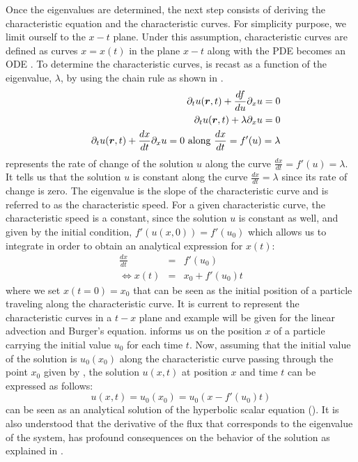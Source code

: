 Once the eigenvalues are determined, the next step consists of deriving the characteristic equation and the characteristic curves. For simplicity purpose, we limit ourself to the $x-t$ plane. Under this assumption, characteristic curves are defined as curves $x = x(t)$ in the plane $x-t$ along with the PDE becomes an ODE \cite{Toro}. To determine the characteristic curves,  is recast as a function of the eigenvalue, $\lambda$, by using the chain rule as shown in .
%
\begin{eqnarray}\label{eq:ivp3_sct1b}
&&\partial_t u(\boldsymbol r,t) + \frac{df}{du}\partial_x u = 0 \nonumber\\
&&\partial_t u(\boldsymbol r,t) + \lambda \partial_x u = 0 \nonumber \\
&&\partial_t u(\boldsymbol r,t) + \frac{dx}{dt} \partial_x u = 0 \text{ along } \frac{dx}{dt} = f'(u) = \lambda 
\end{eqnarray}
%
 represents the rate of change of the solution $u$ along the curve $\frac{dx}{dt} = f'(u) = \lambda$. It tells us that the solution $u$ is constant along the curve $\frac{dx}{dt} = \lambda$ since its rate of change is zero. The eigenvalue is the slope of the characteristic curve and is referred to as the characteristic speed. 
For a given characteristic curve, the characteristic speed is a constant, since the solution $u$ is constant as well, and given by the initial condition, $f'(u(x,0))=f'(u_0)$ which allows us to integrate in order to obtain an analytical expression for $x(t)$:
%
\begin{eqnarray}\label{eq:ivp4_sct1b}
\frac{dx}{dt} &=& f'(u_0) \nonumber \\
\Leftrightarrow x(t) &=& x_0 + f'(u_0)t
\end{eqnarray}
%
where we set $x(t=0) = x_0$ that can be seen as the initial position of a particle traveling along the characteristic curve. It is current to represent the characteristic curves in a $t-x$ plane and example will be given for the linear advection and Burger's equation.  informs us on the position $x$ of a particle carrying the initial value $u_0$ for each time $t$. Now, assuming that the initial value of the solution is $u_0(x_0)$ along the characteristic curve passing through the point $x_0$ given by , the solution $u(x,t)$ at position $x$ and time $t$ can be expressed as follows:
%
\begin{equation}\label{eq:ivp5_sct1b}
u(x,t) = u_0(x_0) = u_0(x - f'(u_0)t)
\end{equation}
%
 can be seen as an analytical solution of the hyperbolic scalar equation (). It is also understood that the derivative of the flux that corresponds to the eigenvalue of the system, has profound consequences on the behavior of the solution as explained in . 
